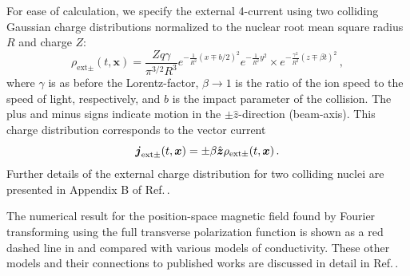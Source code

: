 For ease of calculation, we specify the external 4-current using two colliding Gaussian charge distributions normalized to the nuclear root mean square radius $R$ and charge $Z$:
\begin{equation}\label{eq:rhoext}
\rho_{\text{ext}\pm }(t,\boldsymbol{x}) = \frac{Zq\gamma}{\pi^{3/2}R^3}e^{-\frac{1}{R^2}(x\mp b/2)^2}e^{-\frac{1}{R^2}y^2}
\times e^{-\frac{\gamma^2}{R^2}(z\mp \beta t)^2}\,,
\end{equation}
where $\gamma$ is  as before the Lorentz-factor, $\beta\to 1$ is the ratio of the ion speed to the speed of light, respectively, and $b$ is the impact parameter of the collision. The plus and minus signs indicate motion in the $\pm \hat{z}$-direction (beam-axis). This charge distribution corresponds to the vector current
\begin{equation}\label{eq:jext}
\boldsymbol{j}_{\text{ext}\pm}(t, \boldsymbol{x}) = \pm \beta \hat{\boldsymbol{z}} \rho_{\text{ext}\pm}(t, \boldsymbol{x})\,.
\end{equation}
Further details of the external charge distribution for two colliding nuclei are presented in Appendix B  of Ref.\,\cite{Grayson:2022asf}.

The numerical result for the position-space magnetic field found by Fourier transforming  using the full transverse polarization function  is shown as a red dashed line in  and compared with various models of conductivity. These other models and their connections to published works are discussed in detail in  Ref.\,\cite{Grayson:2022asf}.

